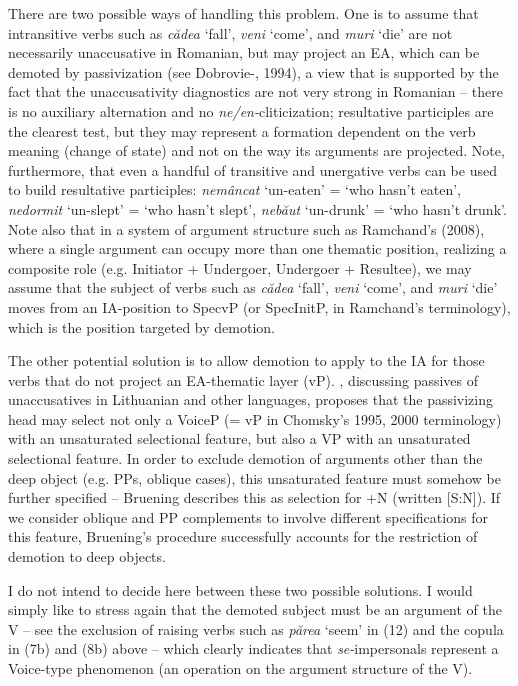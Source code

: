 \documentclass[output=paper]{langsci/langscibook}
\begin{document}
There are two possible ways of handling this problem. One is to assume that intransitive verbs such as \textit{cădea} ‘fall’, \textit{veni} ‘come’, and \textit{muri} ‘die’ are not necessarily unaccusative in Romanian, but may project an EA, which can be demoted by passivization (see Dobrovie-\citealt{Sorin1987}, 1994), a view that is supported by the fact that the unaccusativity diagnostics are not very strong in Romanian – there is no auxiliary alternation and no \textit{ne/en-}cliticization; resultative participles are the clearest test, but they may represent a formation dependent on the verb meaning (change of state) and not on the way its arguments are projected. Note, furthermore, that even a handful of transitive and unergative verbs can be used to build resultative participles: \textit{nemâncat} ‘un-eaten’ = ‘who hasn’t eaten’, \textit{nedormit} ‘un-slept’ = ‘who hasn’t slept’, \textit{nebăut} ‘un-drunk’ = ‘who hasn’t drunk’. Note also that in a system of argument structure such as Ramchand’s (2008), where a single argument can occupy more than one thematic position, realizing a composite role (e.g. Initiator + Undergoer, Undergoer + Resultee), we may assume that the subject of verbs such as \textit{cădea} ‘fall’, \textit{veni} ‘come’, and \textit{muri} ‘die’ moves from an IA-position to SpecvP (or SpecInitP, in Ramchand’s terminology), which is the position targeted by demotion.   

  The other potential solution is to allow demotion to apply to the IA for those verbs that do not project an EA-thematic layer (vP). \citet{Bruening2012}, discussing passives of unaccusatives in Lithuanian and other languages, proposes that the passivizing head may select not only a VoiceP (= vP in Chomsky’s 1995, 2000 terminology) with an unsaturated selectional feature, but also a VP with an unsaturated selectional feature. In order to exclude demotion of arguments other than the deep object (e.g. PPs, oblique cases), this unsaturated feature must somehow be further specified – Bruening describes this as selection for +N (written [S:N]). If we consider oblique and PP complements to involve different specifications for this feature, Bruening’s procedure successfully accounts for the restriction of demotion to deep objects. 

  I do not intend to decide here between these two possible solutions. I would simply like to stress again that the demoted subject must be an argument of the V – see the exclusion of raising verbs such as \textit{părea} ‘seem’ in (12) and the copula in (7b) and (8b) above – which clearly indicates that \textit{se-}impersonals represent a Voice-type phenomenon (an operation on the argument structure of the V). 
\end{document}
